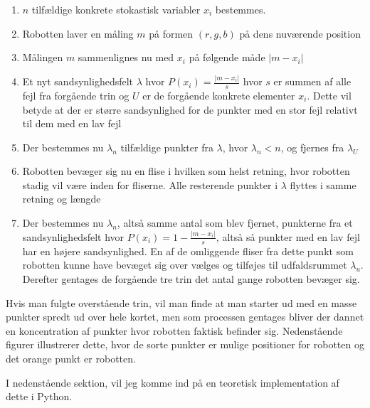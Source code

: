 \documentclass[../../SRP.tex]{subfiles}
\begin{document}
\begin{enumerate}
  \item $n$ tilfældige konkrete stokastisk variabler $x_i$ bestemmes.

  \item Robotten laver en måling $m$ på formen $(r,g,b)$ på dens nuværende position

  \item Målingen $m$ sammenlignes nu med $x_i$ på følgende måde $|m - x_i|$

  \item Et nyt sandsynlighedsfelt $\lambda$ hvor $P(x_i) = \frac{|m - x_i|}{s}$ hvor $s$ er summen af alle fejl fra forgående trin og $U$ er de forgående konkrete elementer $x_i$. Dette vil betyde at der er større sandsynlighed for de punkter med en stor fejl relativt til dem med en lav fejl

  \item Der bestemmes nu $\lambda_n$ tilfældige punkter fra $\lambda$, hvor $ \lambda_n < n$, og fjernes fra $\lambda_U$

  \item Robotten bevæger sig nu en flise i hvilken som helst retning, hvor robotten stadig vil være inden for fliserne. Alle resterende punkter i $\lambda$ flyttes i samme retning og længde 

  \item Der bestemmes nu $\lambda_n$, altså samme antal som blev fjernet, punkterne fra et sandsynlighedsfelt hvor $P(x_i) = 1-\frac{|m-x_i|}{s}$, altså så punkter med en lav fejl har en højere sandsynlighed. En af de omliggende fliser fra dette punkt som robotten kunne have bevæget sig over vælges og tilføjes til udfaldsrummet $\lambda_u$. Derefter gentages de forgående tre trin det antal gange robotten bevæger sig.
\end{enumerate}
Hvis man fulgte overstående trin, vil man finde at man starter ud med en masse punkter spredt ud over hele kortet, men som processen gentages bliver der dannet en koncentration af punkter hvor robotten faktisk befinder sig. Nedenstående figurer illustrerer dette, hvor de sorte punkter er mulige positioner for robotten og det orange punkt er robotten.
\begin{center}
\end{center}
I nedenstående sektion, vil jeg komme ind på en teoretisk implementation af dette i Python.
\end{document}
